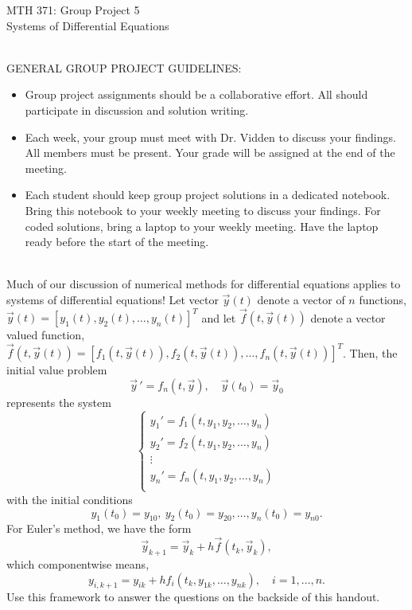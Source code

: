 \documentclass[addpoints, 11pt]{exam}
\begin{document}
\vspace{100mm}
\begin{center} \Large
MTH 371: Group Project 5 \\ Systems of Differential Equations \normalsize
\end{center}
\ \\
\noindent GENERAL GROUP PROJECT GUIDELINES: 
\begin{itemize}
\item Group project assignments should be a collaborative effort. All should participate in discussion and solution writing. \vspace{-2mm}
\item Each week, your group must meet with Dr. Vidden to discuss your findings. All members must be present. Your grade will be assigned at the end of the meeting. \vspace{-2mm}
\item Each student should keep group project solutions in a dedicated notebook. Bring this notebook to your weekly meeting to discuss your findings. For coded solutions, bring a laptop to your weekly meeting. Have the laptop ready before the start of the meeting. \vspace{-2mm}
\end{itemize}
\ \\

\noindent Much of our discussion of numerical methods for differential equations applies to systems of differential equations! Let vector $\vec{y}(t)$ denote a vector of $n$ functions, $\vec{y}(t) = [ y_1(t), y_2(t), \dots, y_n(t) ]^T$ and let $\vec{f}(t,\vec{y}(t))$ denote a vector valued function, $\vec{f}(t,\vec{y}(t))=[f_1(t,\vec{y}(t)), f_2(t,\vec{y}(t)), \dots, f_n(t,\vec{y}(t))]^T$. Then, the initial value problem
$$
\vec{y}\,' = f_n\left(t,\vec{y}\right), \quad \vec{y}(t_0) = \vec{y}_0
$$
represents the system
$$
\begin{cases}
y_1' = f_1(t,y_1,y_2, \dots, y_n) \\
y_2' = f_2(t,y_1,y_2, \dots, y_n) \\
\vdots \\
y_n' = f_n(t,y_1,y_2, \dots, y_n) \\
\end{cases}
$$
with the initial conditions
$$
y_1(t_0)=y_{10}, \ y_2(t_0)=y_{20}, \dots, y_n(t_0)=y_{n0}.
$$
For Euler's method, we have the form
$$
\vec{y}_{k+1} = \vec{y}_k + h \vec{f}(t_k,\vec{y}_k),
$$
which componentwise means,
$$
y_{i,k+1} = y_{ik} + h f_i(t_k,y_{1k},\dots,y_{nk}), \quad i=1,\dots,n.
$$
Use this framework to answer the questions on the backside of this handout.
\pagebreak
\end{document}
